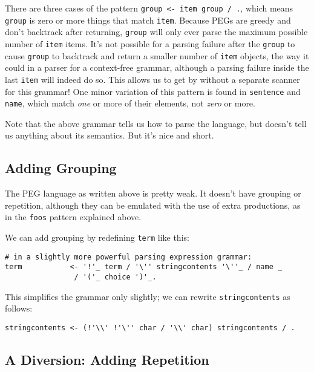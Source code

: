 \documentclass[
]{article}
\begin{document}
There are three cases of the pattern
\texttt{group\ \textless{}-\ item\ group\ /\ .}, which means
\texttt{group} is zero or more things that match \texttt{item}. Because
PEGs are greedy and don't backtrack after returning, \texttt{group} will
only ever parse the maximum possible number of \texttt{item} items. It's
not possible for a parsing failure after the \texttt{group} to cause
\texttt{group} to backtrack and return a smaller number of \texttt{item}
objects, the way it could in a parser for a context-free grammar,
although a parsing failure inside the last \texttt{item} will indeed do
so. This allows us to get by without a separate scanner for this
grammar! One minor variation of this pattern is found in
\texttt{sentence} and \texttt{name}, which match \emph{one} or more of
their elements, not \emph{zero} or more.

Note that the above grammar tells us how to parse the language, but
doesn't tell us anything about its semantics. But it's nice and short.

\hypertarget{adding-grouping}{%
\subsection{Adding Grouping}\label{adding-grouping}}

The PEG language as written above is pretty weak. It doesn't have
grouping or repetition, although they can be emulated with the use of
extra productions, as in the \texttt{foos} pattern explained above.

We can add grouping by redefining \texttt{term} like this:

\begin{verbatim}
# in a slightly more powerful parsing expression grammar:
term           <- '!'_ term / '\'' stringcontents '\''_ / name _ 
                / '('_ choice ')'_.
\end{verbatim}

This simplifies the grammar only slightly; we can rewrite
\texttt{stringcontents} as follows:

\begin{verbatim}
stringcontents <- (!'\\' !'\'' char / '\\' char) stringcontents / .
\end{verbatim}

\hypertarget{a-diversion-adding-repetition}{%
\subsection{A Diversion: Adding
Repetition}\label{a-diversion-adding-repetition}}
\end{document}
